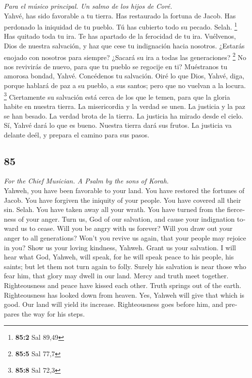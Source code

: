 \begin{paracol}{2}
\emph{Para el músico principal. Un salmo de los hijos de Coré.}\\
 Yahvé, has sido favorable a tu tierra. Has restaurado la
fortuna de Jacob.  Has perdonado la iniquidad de tu
pueblo. Tú has cubierto todo su pecado. Selah. \footnote{\textbf{85:2}
  Sal 89,49}  Has quitado toda tu ira. Te has apartado de
la ferocidad de tu ira.  Vuélvenos, Dios de nuestra
salvación, y haz que cese tu indignación hacia nosotros. 
¿Estarás enojado con nosotros para siempre? ¿Sacará su ira a todas las
generaciones? \footnote{\textbf{85:5} Sal 77,7}  No nos
revivirás de nuevo, para que tu pueblo se regocije en ti? 
Muéstranos tu amorosa bondad, Yahvé. Concédenos tu salvación.
 Oiré lo que Dios, Yahvé, diga, porque hablará de paz a su
pueblo, a sus santos; pero que no vuelvan a la locura. \footnote{\textbf{85:8}
  Sal 72,3}  Ciertamente su salvación está cerca de los
que le temen, para que la gloria habite en nuestra tierra.
 La misericordia y la verdad se unen. La justicia y la
paz se han besado.  La verdad brota de la tierra. La
justicia ha mirado desde el cielo.  Sí, Yahvé dará lo que
es bueno. Nuestra tierra dará sus frutos.  La justicia va
delante deél, y prepara el camino para sus pasos.

\switchcolumn
\begin{otherlanguage}{english}

\hypertarget{section-169}{%
\section{85}\label{section-169}}

\emph{For the Chief Musician. A Psalm by the sons of Korah.}\\
 Yahweh, you have been favorable to your land. You have
restored the fortunes of Jacob.  You have forgiven the
iniquity of your people. You have covered all their sin. Selah.
 You have taken away all your wrath. You have turned from
the fierceness of your anger.  Turn us, God of our
salvation, and cause your indignation toward us to cease. 
Will you be angry with us forever? Will you draw out your anger to all
generations?  Won't you revive us again, that your people
may rejoice in you?  Show us your loving kindness, Yahweh.
Grant us your salvation.  I will hear what God, Yahweh,
will speak, for he will speak peace to his people, his saints; but let
them not turn again to folly.  Surely his salvation is
near those who fear him, that glory may dwell in our land.
 Mercy and truth meet together. Righteousness and peace
have kissed each other.  Truth springs out of the earth.
Righteousness has looked down from heaven.  Yes, Yahweh
will give that which is good. Our land will yield its increase.
 Righteousness goes before him, and prepares the way for
his steps.


\end{otherlanguage}
\end{paracol}
